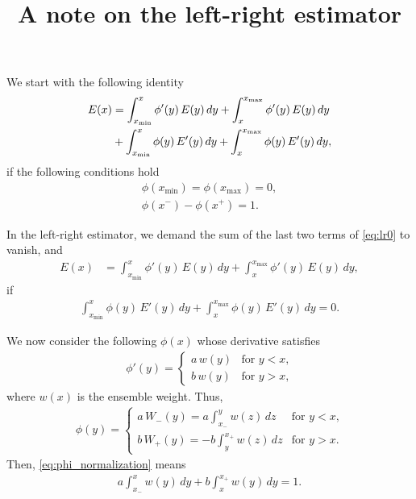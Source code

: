 \documentclass[12pt]{article}
\begin{document}
\title{A note on the left-right estimator}
\author{ \vspace{-10ex} }
\date{ \vspace{-10ex} }
\maketitle

We start with the following identity
\begin{align}
  E(x)
&=
  \int_{x_{\min}}^x \phi'(y) \, E(y) \, dy
  +
  \int_x^{x_{\max}} \phi'(y) \, E(y) \, dy
\notag
\\
&
  +
  \int_{x_{\min}}^x \phi(y) \, E'(y) \, dy
  +
  \int_x^{x_{\max}} \phi(y) \, E'(y) \, dy,
\label{eq:lr0}
\end{align}
if the following conditions hold
%
\begin{align}
  \phi(x_{\min}) = \phi(x_{\max}) = 0,
\\
  \phi(x^{-}) - \phi(x^{+}) = 1.
  \label{eq:phi_normalization}
\end{align}

In the left-right estimator,
we demand the sum of the last two terms of \eqref{eq:lr0} to vanish,
and
\begin{align}
  E(x)
&=
  \int_{x_{\min}}^x \phi'(y) \, E(y) \, dy
  +
  \int_x^{x_{\max}} \phi'(y) \, E(y) \, dy,
\label{eq:lr1}
\end{align}
if
\begin{align}
  \int_{x_{\min}}^x \phi(y) \, E'(y) \, dy
+
  \int_x^{x_{\max}} \phi(y) \, E'(y) \, dy
= 0.
\label{eq:lr1_constraint}
\end{align}


We now consider the following $\phi(x)$
whose derivative satisfies
\begin{align}
  \phi'(y)
=
  \begin{cases}
    a \, w(y) &   \mbox{for $y < x$,} \\
    b \, w(y) &   \mbox{for $y > x$,}
  \end{cases}
\end{align}
where $w(x)$ is the ensemble weight.
%
Thus,
\begin{align}
  \phi(y)
=
  \begin{cases}
    a \, W_-(y) = a \int_{x_-}^y w(z) \, dz   &   \mbox{for $y < x$,} \\
    b \, W_+(y) = -b \int_y^{x_+} w(z) \, dz  &   \mbox{for $y > x$.}
  \end{cases}
  \label{eq:phi_W}
\end{align}
%
Then, \eqref{eq:phi_normalization} means
\begin{align}
  a \int_{x_-}^x w(y) \, dy
+
  b \int_{x}^{x_+} w(y) \, dy
=
  1.
  \label{eq:phi_normalization1}
\end{align}
\end{document}
